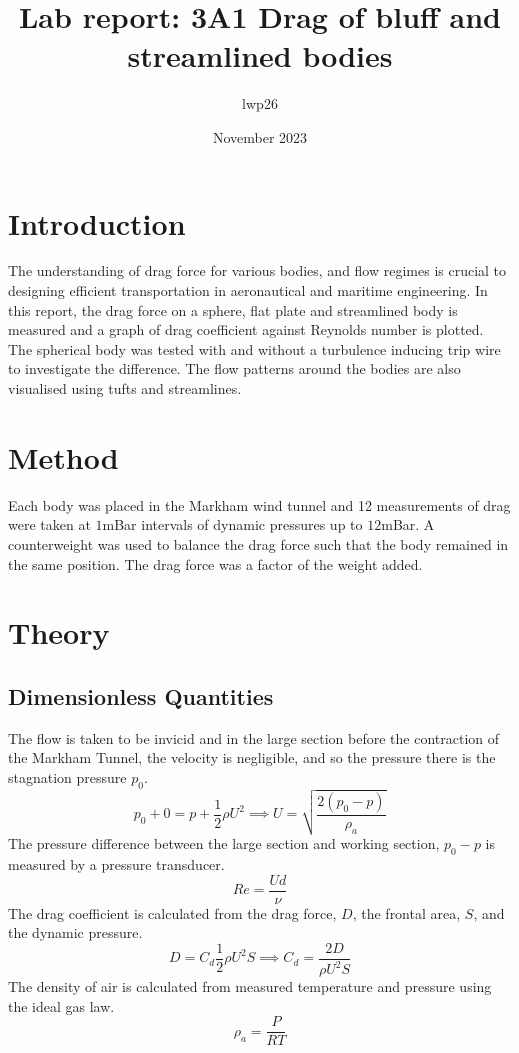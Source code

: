 \documentclass[8pt]{article}
\begin{document}


\title{Lab report: 3A1 Drag of bluff and streamlined bodies}
\author{lwp26}
\date{November 2023}
\maketitle

\section{Introduction}

The understanding of drag force for various bodies, and flow regimes is crucial to designing efficient transportation in aeronautical and maritime engineering.
In this report, the drag force on a sphere, flat plate and streamlined body is measured and a graph of drag coefficient against Reynolds number is plotted.
The spherical body was tested with and without a turbulence inducing trip wire to investigate the difference.
The flow patterns around the bodies are also visualised using tufts and streamlines.

\section{Method}
Each body was placed in the Markham wind tunnel and 12 measurements of drag were taken at $1$mBar intervals of dynamic pressures up to $12$mBar.
A counterweight was used to balance the drag force such that the body remained in the same position. The drag force was a factor of the weight added.

\section{Theory}

\subsection{Dimensionless Quantities}

The flow is taken to be invicid and in the large section before the contraction of the Markham Tunnel, the velocity is negligible, and so the pressure there is the stagnation pressure $p_0$.
\begin{equation}
    p_0 + 0 = p + \frac{1}{2}\rho U^2 \implies U = \sqrt{\frac{2(p_0-p)}{\rho_a}}
    \label{eq1}
\end{equation}
The pressure difference between the large section and working section, $p_0 - p$ is measured by a pressure transducer.
\begin{equation}
    Re = \frac{Ud}{\nu}
    \label{re}
\end{equation}
The drag coefficient is calculated from the drag force, $D$, the frontal area, $S$, and the dynamic pressure.
\begin{equation}
    D = C_d \frac{1}{2} \rho U^2 S \implies C_d = \frac{2D}{ \rho U^2 S}
\end{equation}
The density of air is calculated from measured temperature and pressure using the ideal gas law.
\begin{equation}
    \rho_a = \frac{P}{RT}
\end{equation}
\end{document}

